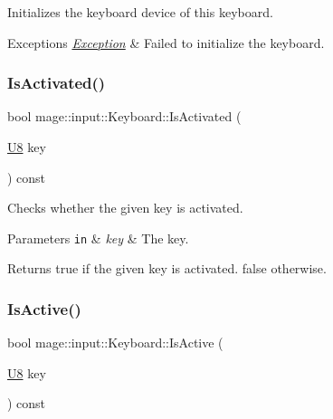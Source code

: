 Initializes the keyboard device of this keyboard.


\begin{DoxyExceptions}{Exceptions}
{\em \mbox{\hyperlink{classmage_1_1_exception}{Exception}}} & Failed to initialize the keyboard. \\
\hline
\end{DoxyExceptions}
\mbox{\label{classmage_1_1input_1_1_keyboard_a0afe5b5fde182d771817272deb8ae1fc}} 
\subsubsection{\texorpdfstring{Is\+Activated()}{IsActivated()}}
{\footnotesize\ttfamily bool mage\+::input\+::\+Keyboard\+::\+Is\+Activated (\begin{DoxyParamCaption}\item[{\mbox{\hyperlink{namespacemage_a30677c03d683c4c35630c25f6ff3fb7f}{U8}}}]{key }\end{DoxyParamCaption}) const\hspace{0.3cm}{\ttfamily [noexcept]}}

Checks whether the given key is activated.


\begin{DoxyParams}[1]{Parameters}
\mbox{\tt in}  & {\em key} & The key. \\
\hline
\end{DoxyParams}
\begin{DoxyReturn}{Returns}
{\ttfamily true} if the given key is activated. {\ttfamily false} otherwise. 
\end{DoxyReturn}
\mbox{\label{classmage_1_1input_1_1_keyboard_a89d22e870c94d01d5338e2e9e6cf5f46}} 
\subsubsection{\texorpdfstring{Is\+Active()}{IsActive()}}
{\footnotesize\ttfamily bool mage\+::input\+::\+Keyboard\+::\+Is\+Active (\begin{DoxyParamCaption}\item[{\mbox{\hyperlink{namespacemage_a30677c03d683c4c35630c25f6ff3fb7f}{U8}}}]{key }\end{DoxyParamCaption}) const\hspace{0.3cm}{\ttfamily [noexcept]}}

